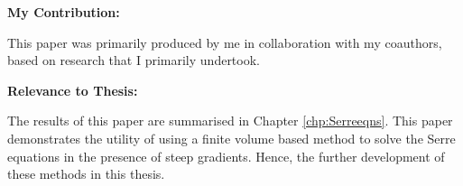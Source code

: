 	\noindent\textbf{My Contribution:}
	
 This paper was primarily produced by me in collaboration with my coauthors, based on research that I primarily undertook.
\vspace*{\baselineskip}


	\noindent\textbf{Relevance to Thesis:}
	
	The results of this paper are summarised in Chapter \ref{chp:Serreeqns}. This paper demonstrates the utility of using a finite volume based method to solve the Serre equations in the presence of steep gradients. Hence, the further development of these methods in this thesis.	